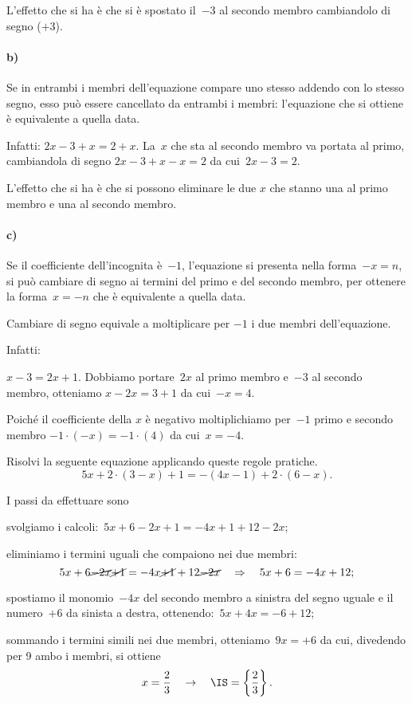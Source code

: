 L'effetto che si ha è che si è spostato il~$-3$ al
secondo membro cambiandolo di segno ($+3$).

\paragraph{b)} Se in entrambi i membri dell'equazione compare uno
stesso addendo con lo stesso segno, esso può essere cancellato da
entrambi i membri: l'equazione che si ottiene è
equivalente a quella data.

Infatti:
$2x-3+x=2+x$. La~$x$ che sta al secondo membro va portata al primo, cambiandola di segno
$2x-3+x-x=2$ da cui~$2x-3=2$.

L'effetto che si ha è che si possono eliminare le due
$x$ che stanno una al primo membro e una al secondo membro.


\paragraph{c)} Se il coefficiente dell'incognita è~$-1$, %
l'equazione si presenta nella forma~$-x=n$, si
può cambiare di segno ai termini del primo e del secondo membro, per
ottenere la forma~$x=-n$ che è equivalente a quella data.

Cambiare di segno equivale a moltiplicare per
$-1$ i due membri dell'equazione.

Infatti:

$x-3=2x+1$. Dobbiamo portare~$2x$ al primo membro e~$-3$ al secondo membro, otteniamo
$x-2x=3+1$ da cui~$-x=4$.

Poiché il coefficiente della $x$ è negativo moltiplichiamo per~$-1$
primo e secondo membro
$-1\cdot (-x)=-1\cdot (4)$ da cui~$x=-4$.

\begin{problema}
 Risolvi la seguente equazione applicando queste regole pratiche.
 \[5x+2\cdot (3-x)+1=-(4x-1)+2\cdot (6-x).\]
\end{problema}

\begin{soluzione}
I passi da effettuare sono
\begin{enumeratea}
 \item svolgiamo i calcoli:~$5x+6-2x+1=-4x+1+12-2x$;
 \item eliminiamo i termini uguali che compaiono nei due membri:
 \[5x+6 \cancel{-2x}\cancel{+1}=-4x \cancel{+1}+12\cancel{-2x}\quad\Rightarrow\quad 5x+6=-4x+12;\]
 \item spostiamo il monomio~$-4x$ del secondo membro a sinistra del segno uguale e il numero~$+6$
da sinista a destra, ottenendo:~$5x+4x=-6+12$;
\item sommando i termini simili nei due membri, otteniamo~$9x=+6$ da cui, divedendo per 9
 ambo i membri, si ottiene
 \[x=\dfrac{2}{3}\quad\to\quad \IS =\left\{\dfrac{2}{3}\right\}.\]
 \end{enumeratea}

\end{soluzione}
\ovalbox{\risolvii \ref{ese:13.14}, \ref{ese:13.15}, \ref{ese:13.16}, \ref{ese:13.17}, \ref{ese:13.18}}

